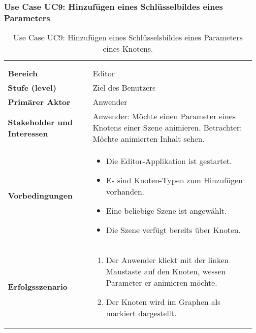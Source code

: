 
\subsubsection{Use Case UC9: Hinzufügen eines Schlüsselbildes eines Parameters}
\label{ssubsec:requirements:use-cases:uc9}

\begin{longtabu}{p{0.5\textwidth}p{0.5\textwidth}}
    \centering\\
    \caption{Use Case UC9: Hinzufügen eines Schlüsselsbildes eines Parameters
        eines Knotens.}\label{table:uc9-add-animation}\\
    \toprule
        \textbf{Bereich} &
        Editor \\
    \cmidrule(r){1-1}\cmidrule(lr){2-2}
        \textbf{Stufe (level)} &
        Ziel des Benutzers \\
    \cmidrule(r){1-1}\cmidrule(lr){2-2}
        \textbf{Primärer Aktor} &
        Anwender \\
    \cmidrule(r){1-1}\cmidrule(lr){2-2}
        \textbf{Stakeholder und Interessen} &
        Anwender: Möchte einen Parameter eines Knotens einer Szene
        animieren.\newline
        Betrachter: Möchte animierten Inhalt sehen.\\
    \cmidrule(r){1-1}\cmidrule(lr){2-2}
        \textbf{Vorbedingungen} &
        \begin{itemize}
            \item{Die Editor-Applikation ist gestartet.}
            \item{Es sind Knoten-Typen zum Hinzufügen vorhanden.}
            \item{Eine beliebige Szene ist angewählt.}
            \item{Die Szene verfügt bereits über Knoten.}
        \end{itemize} \\
    \cmidrule(r){1-1}\cmidrule(lr){2-2}
        \textbf{Erfolgsszenario} &
        \begin{enumerate}
            \item{Der Anwender klickt mit der linken Maustaste auf den
                    Knoten, wessen Parameter er animieren möchte.}
            \item{Der Knoten wird im Graphen als markiert dargestellt.}

\end{enumerate}
\end{longtabu}

